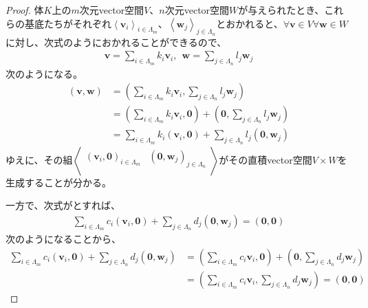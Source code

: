 \documentclass[dvipdfmx]{jsarticle}
\begin{document}
\begin{proof}
体$K$上の$m$次元vector空間$V$、$n$次元vector空間$W$が与えられたとき、これらの基底たちがそれぞれ$\left\langle \mathbf{v}_{i} \right\rangle_{i \in \varLambda_{m}}$、$\left\langle \mathbf{w}_{j} \right\rangle_{j \in \varLambda_{n}}$とおかれると、$\forall\mathbf{v} \in V\forall\mathbf{w} \in W$に対し、次式のようにおかれることができるので、
\begin{align*}
\mathbf{v} = \sum_{i \in \varLambda_{m}} {k_{i}\mathbf{v}_{i}},\ \ \mathbf{w} = \sum_{j \in \varLambda_{n}} {l_{j}\mathbf{w}_{j}}
\end{align*}
次のようになる。
\begin{align*}
\left( \mathbf{v},\mathbf{w} \right) &= \left( \sum_{i \in \varLambda_{m}} {k_{i}\mathbf{v}_{i}},\sum_{j \in \varLambda_{n}} {l_{j}\mathbf{w}_{j}} \right)\\
&= \left( \sum_{i \in \varLambda_{m}} {k_{i}\mathbf{v}_{i}},\mathbf{0} \right) + \left( \mathbf{0},\sum_{j \in \varLambda_{n}} {l_{j}\mathbf{w}_{j}} \right)\\
&= \sum_{i \in \varLambda_{m}} {k_{i}\left( \mathbf{v}_{i},\mathbf{0} \right)} + \sum_{j \in \varLambda_{n}} {l_{j}\left( \mathbf{0},\mathbf{w}_{j} \right)}
\end{align*}
ゆえに、その組$\left\langle \begin{matrix}
\left( \mathbf{v}_{i},\mathbf{0} \right)_{i \in \varLambda_{m}} & \left( \mathbf{0},\mathbf{w}_{j} \right)_{j \in \varLambda_{n}} \\
\end{matrix} \right\rangle$がその直積vector空間$V \times W$を生成することが分かる。\par
一方で、次式がとすれば、
\begin{align*}
\sum_{i \in \varLambda_{m}} {c_{i}\left( \mathbf{v}_{i},\mathbf{0} \right)} + \sum_{j \in \varLambda_{n}} {d_{j}\left( \mathbf{0},\mathbf{w}_{j} \right)} = \left( \mathbf{0},\mathbf{0} \right)
\end{align*}
次のようになることから、
\begin{align*}
\sum_{i \in \varLambda_{m}} {c_{i}\left( \mathbf{v}_{i},\mathbf{0} \right)} + \sum_{j \in \varLambda_{n}} {d_{j}\left( \mathbf{0},\mathbf{w}_{j} \right)} &= \left( \sum_{i \in \varLambda_{m}} {c_{i}\mathbf{v}_{i}},\mathbf{0} \right) + \left( \mathbf{0},\sum_{j \in \varLambda_{n}} {d_{j}\mathbf{w}_{j}} \right)\\
&= \left( \sum_{i \in \varLambda_{m}} {c_{i}\mathbf{v}_{i}},\sum_{j \in \varLambda_{n}} {d_{j}\mathbf{w}_{j}} \right) = \left( \mathbf{0},\mathbf{0} \right)

\end{align*}
\end{proof}
\end{document}
